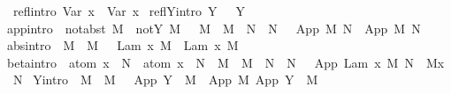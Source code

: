 \begin{isabellebody}
\isanewline
\ \ refl{\isacharbrackleft}intro{\isacharbrackright}{\isacharcolon}\ {\isachardoublequoteopen}{\isacharparenleft}Var\ x{\isacharparenright}\ {\isachargreater}{\isachargreater}{\isachargreater}\ {\isacharparenleft}Var\ x{\isacharparenright}{\isachardoublequoteclose}\isanewline
{\isacharbar}\ reflY{\isacharbrackleft}intro{\isacharbrackright}{\isacharcolon}\ {\isachardoublequoteopen}Y\ {\isasymsigma}\ {\isachargreater}{\isachargreater}{\isachargreater}\ Y\ {\isasymsigma}{\isachardoublequoteclose}\isanewline
{\isacharbar}\ app{\isacharbrackleft}intro{\isacharbrackright}{\isacharcolon}\ {\isachardoublequoteopen}{\isasymlbrakk}\ not{\isacharunderscore}abst\ M\ {\isacharsemicolon}\ not{\isacharunderscore}Y\ M\ {\isacharsemicolon}\ \ M\ {\isachargreater}{\isachargreater}{\isachargreater}\ M{\isacharprime}\ {\isacharsemicolon}\ N\ {\isachargreater}{\isachargreater}{\isachargreater}\ N{\isacharprime}\ {\isasymrbrakk}\ {\isasymLongrightarrow}\ App\ M\ N\ {\isachargreater}{\isachargreater}{\isachargreater}\ App\ M{\isacharprime}\ N{\isacharprime}{\isachardoublequoteclose}\isanewline
{\isacharbar}\ abs{\isacharbrackleft}intro{\isacharbrackright}{\isacharcolon}\ {\isachardoublequoteopen}{\isasymlbrakk}\ M\ {\isachargreater}{\isachargreater}{\isachargreater}\ M{\isacharprime}\ {\isasymrbrakk}\ {\isasymLongrightarrow}\ Lam\ {\isacharbrackleft}x{\isacharbrackright}{\isachardot}\ M\ {\isachargreater}{\isachargreater}{\isachargreater}\ Lam\ {\isacharbrackleft}x{\isacharbrackright}{\isachardot}\ M{\isacharprime}{\isachardoublequoteclose}\isanewline
{\isacharbar}\ beta{\isacharbrackleft}intro{\isacharbrackright}{\isacharcolon}\ {\isachardoublequoteopen}{\isasymlbrakk}\ atom\ x\ {\isasymsharp}\ N\ {\isacharsemicolon}\ atom\ x\ {\isasymsharp}\ N{\isacharprime}\ {\isacharsemicolon}\ M\ {\isachargreater}{\isachargreater}{\isachargreater}\ M{\isacharprime}\ {\isacharsemicolon}\ N\ {\isachargreater}{\isachargreater}{\isachargreater}\ N{\isacharprime}\ {\isasymrbrakk}\ {\isasymLongrightarrow}\ App\ {\isacharparenleft}Lam\ {\isacharbrackleft}x{\isacharbrackright}{\isachardot}\ M{\isacharparenright}\ N\ {\isachargreater}{\isachargreater}{\isachargreater}\ M{\isacharprime}{\isacharbrackleft}x\ {\isacharcolon}{\isacharcolon}{\isacharequal}\ N{\isacharprime}{\isacharbrackright}{\isachardoublequoteclose}\isanewline
{\isacharbar}\ Y{\isacharbrackleft}intro{\isacharbrackright}{\isacharcolon}\ {\isachardoublequoteopen}{\isasymlbrakk}\ M\ {\isachargreater}{\isachargreater}{\isachargreater}\ M{\isacharprime}\ {\isasymrbrakk}\ {\isasymLongrightarrow}\ App\ {\isacharparenleft}Y\ {\isasymsigma}{\isacharparenright}\ M\ {\isachargreater}{\isachargreater}{\isachargreater}\ App\ M{\isacharprime}\ {\isacharparenleft}App\ {\isacharparenleft}Y\ {\isasymsigma}{\isacharparenright}\ M{\isacharprime}{\isacharparenright}{\isachardoublequoteclose}\isanewline

\end{isabellebody}
